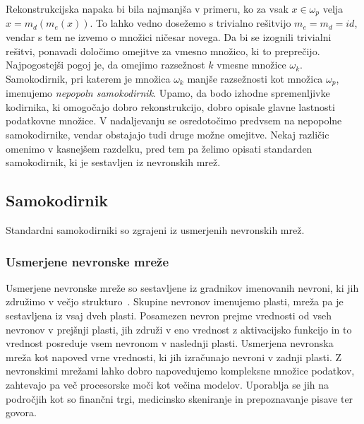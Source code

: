 \documentclass[12pt,a4paper,twoside]{article}
\theoremstyle{definition} %
\theoremstyle{plain} %
\numberwithin{equation}{section}  %
\begin{document}
Rekonstrukcijska napaka bi bila najmanjša v primeru, ko za vsak $x \in \omega_p$ velja $x = m_d(m_e(x))$. 
To lahko vedno dosežemo s trivialno rešitvijo $m_e = m_d = id$, vendar s tem ne izvemo o množici ničesar novega.
Da bi se izognili trivialni rešitvi, ponavadi določimo omejitve za vmesno množico, ki to preprečijo.
Najpogostejši pogoj je, da omejimo razsežnost $k$ vmesne množice $\omega_k$. 
Samokodirnik, pri katerem je množica $\omega_k$ manjše razsežnosti kot množica $\omega_p$, imenujemo \emph{nepopoln samokodirnik}. 
Upamo, da bodo izhodne spremenljivke kodirnika, ki omogočajo dobro rekonstrukcijo, dobro opisale glavne lastnosti podatkovne množice. %
V nadaljevanju se osredotočimo predvsem na nepopolne samokodirnike, vendar obstajajo tudi druge možne omejitve. 
Nekaj različic omenimo v kasnejšem razdelku, pred tem pa želimo opisati standarden samokodirnik, ki je sestavljen iz nevronskih mrež. 



\subsection{Samokodirnik}
Standardni samokodirniki so zgrajeni iz usmerjenih nevronskih mrež.



\subsubsection{Usmerjene nevronske mreže}

Usmerjene nevronske mreže so sestavljene iz gradnikov imenovanih nevroni, ki jih združimo v večjo strukturo~\cite{nielsen2015neural}.
Skupine nevronov imenujemo plasti, mreža pa je sestavljena iz vsaj dveh plasti.
Posamezen nevron prejme vrednosti od vseh nevronov v prejšnji plasti, jih združi v eno vrednost z aktivacijsko funkcijo in to vrednost posreduje vsem nevronom v naslednji plasti.
Usmerjena nevronska mreža kot napoved vrne vrednosti, ki jih izračunajo nevroni v zadnji plasti.
Z nevronskimi mrežami lahko dobro napovedujemo kompleksne množice podatkov, zahtevajo pa več procesorske moči kot večina modelov. 
Uporablja se jih na področjih kot so finančni trgi, medicinsko skeniranje in prepoznavanje pisave ter govora. 
\end{document}
